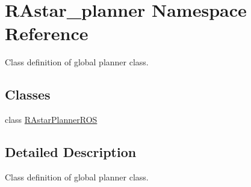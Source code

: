 \hypertarget{namespace_r_astar__planner}{}\section{R\+Astar\+\_\+planner Namespace Reference}
\label{namespace_r_astar__planner}


Class definition of global planner class.  


\subsection*{Classes}
\begin{DoxyCompactItemize}
\item 
class \hyperlink{class_r_astar__planner_1_1_r_astar_planner_r_o_s}{R\+Astar\+Planner\+R\+OS}
\end{DoxyCompactItemize}


\subsection{Detailed Description}
Class definition of global planner class. 